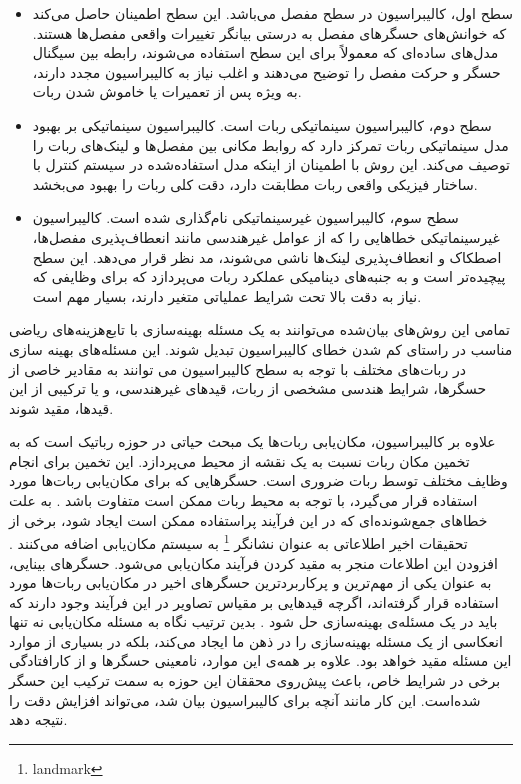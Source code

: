 \begin{itemize}
	\item سطح اول، کالیبراسیون در سطح مفصل می‌باشد. این سطح اطمینان حاصل می‌کند که خوانش‌های حسگرهای مفصل به درستی بیانگر تغییرات واقعی مفصل‌ها هستند. مدل‌های ساده‌ای که معمولاً برای این سطح استفاده می‌شوند، رابطه بین سیگنال حسگر و حرکت مفصل را توضیح می‌دهند و اغلب نیاز به کالیبراسیون مجدد دارند، به ویژه پس از تعمیرات یا خاموش شدن ربات.
	
	
	\item  سطح دوم، کالیبراسیون سینماتیکی ربات است. کالیبراسیون سینماتیکی بر بهبود مدل سینماتیکی ربات تمرکز دارد که روابط مکانی بین مفصل‌ها و لینک‌های ربات را توصیف می‌کند. این روش با اطمینان از اینکه مدل استفاده‌شده در سیستم کنترل با ساختار فیزیکی واقعی ربات مطابقت دارد، دقت کلی ربات را بهبود می‌بخشد. 
	
	
	\item  سطح سوم، کالیبراسیون غیرسینماتیکی نام‌گذاری شده است. کالیبراسیون غیرسینماتیکی خطاهایی را که از عوامل غیرهندسی مانند انعطاف‌پذیری مفصل‌ها، اصطکاک و انعطاف‌پذیری لینک‌ها ناشی می‌شوند، مد نظر قرار می‌دهد. این سطح پیچیده‌تر است و به جنبه‌های دینامیکی عملکرد ربات می‌پردازد که برای وظایفی که نیاز به دقت بالا تحت شرایط عملیاتی متغیر دارند، بسیار مهم است.
	
	
\end{itemize}
تمامی این روش‌های بیان‌شده می‌توانند به یک مسئله‌‌ بهینه‌سازی با تابع‌هزینه‌های ریاضی مناسب در راستای کم شدن خطای کالیبراسیون تبدیل شوند. این مسئله‌های بهینه سازی در ربات‌های مختلف با توجه به سطح کالیبراسیون می توانند به مقادیر خاصی از حسگرها، شرایط هندسی مشخصی از ربات، قیدهای غیرهندسی، و یا ترکیبی از این قیدها، مقید شوند. 

علاوه بر کالیبراسیون، مکان‌یابی ربات‌ها یک مبحث حیاتی در حوزه رباتیک است که به تخمین مکان ربات نسبت به یک نقشه از محیط می‌پردازد. این تخمین برای انجام وظایف مختلف توسط ربات ضروری است. حسگر‌هایی که برای مکان‌یابی ربات‌ها مورد استفاده قرار می‌گیرد، با توجه به محیط ربات ممکن است متفاوت باشد
\cite{malagon2015mobile, burgard1997active}.
به علت خطاهای جمع‌شونده‌ای که در این فرآیند پراستفاده ممکن است ایجاد شود، برخی از تحقیقات اخیر اطلاعاتی به عنوان نشانگر
\footnote{landmark}
به سیستم مکان‌یابی اضافه می‌کنند
\cite{betke1997mobile}.
افزودن این اطلاعات منجر به مقید کردن فرآیند مکان‌یابی می‌شود. حسگر‌های بینایی، به عنوان یکی از مهم‌ترین و پرکاربردترین حسگر‌های اخیر در مکان‌یابی ربات‌ها مورد استفاده قرار گرفته‌اند، اگرچه قید‌هایی بر مقیاس تصاویر در این فرآیند وجود دارند که باید در یک مسئله‌ی بهینه‌سازی حل شود
\cite{Forster2014ICRA}.
 بدین ترتیب نگاه به مسئله مکان‌یابی نه تنها انعکاسی از یک مسئله بهینه‌سازی را در ذهن ما ایجاد می‌کند، بلکه در بسیاری از موارد این مسئله مقید خواهد بود. علاوه بر همه‌ی این موارد، نامعینی‌ حسگر‌ها و از کارافتادگی برخی در شرایط خاص، باعث پیش‌روی محققان این حوزه به سمت ترکیب این حسگر شده‌است. این کار مانند آنچه برای کالیبراسیون بیان شد، می‌تواند افزایش دقت را نتیجه دهد. 
 
